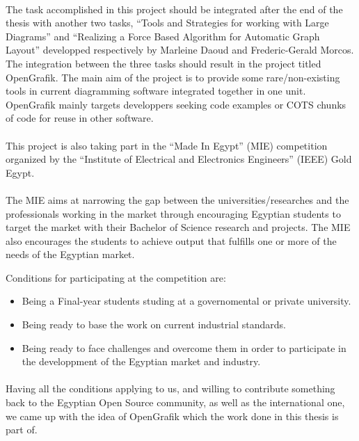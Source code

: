 \paragraph{}
The task accomplished in this project should be integrated after the end of the thesis with another two tasks, ``Tools and Strategies for working with Large Diagrams'' and ``Realizing a Force Based Algorithm for Automatic Graph Layout'' developped respectively by Marleine Daoud and Frederic-Gerald Morcos. The integration between the three tasks should result in the project titled OpenGrafik. The main aim of the project is to provide some rare/non-existing tools in current diagramming software integrated together in one unit. OpenGrafik mainly targets developpers seeking code examples or COTS chunks of code for reuse in other software.

\paragraph{}
This project is also taking part in the ``Made In Egypt'' (MIE) competition organized by the ``Institute of Electrical and Electronics Engineers'' (IEEE) Gold Egypt.

\paragraph{}
The MIE aims at narrowing the gap between the universities/researches and the professionals working in the market through encouraging Egyptian students to target the market with their Bachelor of Science research and projects. The MIE also encourages the students to achieve output that fulfills one or more of the needs of the Egyptian market.

Conditions for participating at the competition are:
\begin{itemize}
\item Being a Final-year students studing at a governomental or private university.
\item Being ready to base the work on current industrial standards.
\item Being ready to face challenges and overcome them in order to participate in the developpment of the Egyptian market and industry.
\end{itemize}

\paragraph{}
Having all the conditions applying to us, and willing to contribute something back to the Egyptian Open Source community, as well as the international one, we came up with the idea of OpenGrafik which the work done in this thesis is part of.

